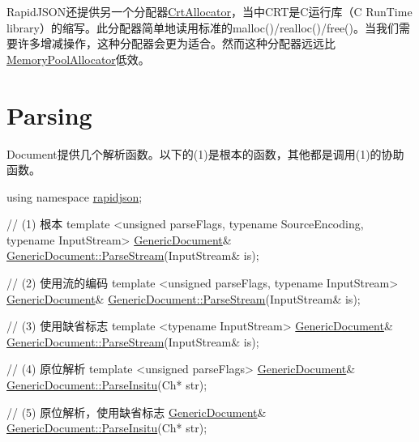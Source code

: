 Rapid\+J\+S\+O\+N还提供另一个分配器{\ttfamily \hyperlink{class_crt_allocator}{Crt\+Allocator}}，当中\+C\+R\+T是\+C运行库（C Run\+Time library）的缩写。此分配器简单地读用标准的{\ttfamily malloc()}/{\ttfamily realloc()}/{\ttfamily free()}。当我们需要许多增减操作，这种分配器会更为适合。然而这种分配器远远比{\ttfamily \hyperlink{class_memory_pool_allocator}{Memory\+Pool\+Allocator}}低效。\hypertarget{md_Cadriciel_Commun_Externe_RapidJSON_doc_sax.zh-cn_Parsing}{}\section{Parsing}\label{md_Cadriciel_Commun_Externe_RapidJSON_doc_sax.zh-cn_Parsing}
{\ttfamily Document}提供几个解析函数。以下的(1)是根本的函数，其他都是调用(1)的协助函数。


\begin{DoxyCode}
\textcolor{keyword}{using namespace }\hyperlink{namespacerapidjson}{rapidjson};

\textcolor{comment}{// (1) 根本}
\textcolor{keyword}{template} <\textcolor{keywordtype}{unsigned} parseFlags, \textcolor{keyword}{typename} SourceEncoding, \textcolor{keyword}{typename} InputStream>
\hyperlink{class_generic_document}{GenericDocument}& \hyperlink{class_generic_document_afe94c0abc83a20f2d7dc1ba7677e6238}{GenericDocument::ParseStream}(InputStream& is);

\textcolor{comment}{// (2) 使用流的编码}
\textcolor{keyword}{template} <\textcolor{keywordtype}{unsigned} parseFlags, \textcolor{keyword}{typename} InputStream>
\hyperlink{class_generic_document}{GenericDocument}& \hyperlink{class_generic_document_afe94c0abc83a20f2d7dc1ba7677e6238}{GenericDocument::ParseStream}(InputStream& is);

\textcolor{comment}{// (3) 使用缺省标志}
\textcolor{keyword}{template} <\textcolor{keyword}{typename} InputStream>
\hyperlink{class_generic_document}{GenericDocument}& \hyperlink{class_generic_document_afe94c0abc83a20f2d7dc1ba7677e6238}{GenericDocument::ParseStream}(InputStream& is);

\textcolor{comment}{// (4) 原位解析}
\textcolor{keyword}{template} <\textcolor{keywordtype}{unsigned} parseFlags>
\hyperlink{class_generic_document}{GenericDocument}& \hyperlink{class_generic_document_a301f8f297a5a0da4b6be5459ad766f75}{GenericDocument::ParseInsitu}(Ch* str);

\textcolor{comment}{// (5) 原位解析，使用缺省标志}
\hyperlink{class_generic_document}{GenericDocument}& \hyperlink{class_generic_document_a301f8f297a5a0da4b6be5459ad766f75}{GenericDocument::ParseInsitu}(Ch* str);


\end{DoxyCode}
